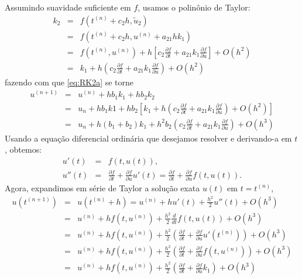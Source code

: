 Assumindo suavidade suficiente em $f$, usamos o polinônio de Taylor:
\begin{eqnarray}
k_2 &=&f(t^{(n)}+c_2h, \tilde{u}_2)\\
   &=&f(t^{(n)}+c_2h, u^{(n)}+ a_{21}h k_1)\\
   &=&f(t^{(n)}, u^{(n)}) + h\left[c_2 \frac{\partial f}{\partial t}+ a_{21} k_1\frac{\partial f}{\partial u}\right]+O(h^2)\\
   &=&k_1 + h\left(c_2 \frac{\partial f}{\partial t}+ a_{21} k_1\frac{\partial f}{\partial u}\right)+O(h^2)
   \end{eqnarray}
fazendo com que \eqref{eq:RK2a} se torne
\begin{eqnarray}
  u^{(n+1)}&=&u^{(n)}   + h b_1 k_1 + hb_2k_2 \\
         &=&u_n  + h b_1 k1 + hb_2\left[ k_1 + h\left(c_2 \frac{\partial f}{\partial t}+ a_{21} k_1\frac{\partial f}{\partial u}\right)+O(h^2)\right]\\
         &=&u_n  + h (b_1+b_2) k_1 + h^2 b_2\left(c_2 \frac{\partial f}{\partial t}+ a_{21} k_1\frac{\partial f}{\partial u}\right)+O(h^3)\label{eq:rk2_1}
\end{eqnarray}
Usando a equação diferencial ordinária que desejamos resolver e derivando-a em $t$, obtemos:
\begin{eqnarray}
  u'(t)    &=&f(t,u(t)),\\
  u''(t) &=&\frac{\partial f}{\partial t}+\frac{\partial f}{\partial u} u'(t) = \frac{\partial f}{\partial t} +\frac{\partial f}{\partial u} f(t,u(t)).
\end{eqnarray}
Agora,  expandimos em série de Taylor a solução exata $u(t)$ em $t=t^{(n)}$,
\begin{eqnarray}
  u(t^{(n+1)})&=&u(t^{(n)}+h)=u^{(n)}  + hu'(t) +\frac{h^2}{2} u''(t) + O(h^3)\\
            &=&u^{(n)}  + hf(t,u^{(n)}) +\frac{h^2}{2}\frac{d }{d t}f(t,u(t))+O(h^3)\\
	    &=&u^{(n)}  + hf(t,u^{(n)}) +\frac{h^2}{2}\left(\frac{\partial f}{\partial t}+\frac{\partial f}{\partial u}u'(t^{(n)})\right) +O(h^3)\\
           &=&u^{(n)}  + hf(t,u^{(n)}) +\frac{h^2}{2}\left(\frac{\partial f}{\partial t}+\frac{\partial f}{\partial u}f(t,u^{(n)})\right) +O(h^3)\\
           &=&u^{(n)}  + hf(t,u^{(n)}) +\frac{h^2}{2}\left(\frac{\partial f}{\partial t}+\frac{\partial f}{\partial u}k_1\right) +O(h^3)\label{eq:rk2_2}
           \end{eqnarray}
